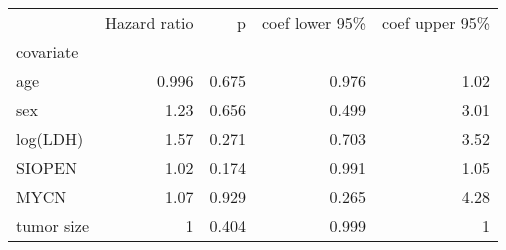 \begin{tabular}{lrrrr}
\toprule
{} &  Hazard ratio &     p &  coef lower 95\% &  coef upper 95\% \\
covariate  &               &       &                  &                  \\
\midrule
age        &         0.996 & 0.675 &            0.976 &             1.02 \\
sex        &          1.23 & 0.656 &            0.499 &             3.01 \\
log(LDH)   &          1.57 & 0.271 &            0.703 &             3.52 \\
SIOPEN     &          1.02 & 0.174 &            0.991 &             1.05 \\
MYCN       &          1.07 & 0.929 &            0.265 &             4.28 \\
tumor size &             1 & 0.404 &            0.999 &                1 \\
\bottomrule
\end{tabular}
